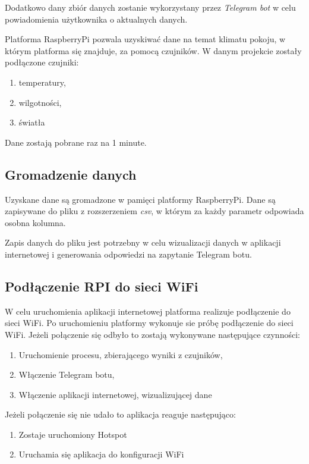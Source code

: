 \documentclass[a4paper]{article}
\begin{document}
Dodatkowo dany zbiór danych zostanie wykorzystany przez \textit{Telegram bot}
w celu powiadomienia użytkownika o aktualnych danych.

Platforma RaspberryPi pozwala uzyskiwać dane na temat klimatu pokoju, w którym platforma się znajduje, za pomocą czujników. W danym projekcie zostały podłączone czujniki:
\begin{enumerate}
\item temperatury,
\item wilgotności,
\item światła
\end{enumerate}

Dane zostają pobrane raz na 1 minute.

\subsection{Gromadzenie danych}

Uzyskane dane są gromadzone w pamięci platformy RaspberryPi. Dane są zapisywane do pliku z rozszerzeniem \textit{csv}, w którym za każdy parametr odpowiada osobna kolumna.

Zapis danych do pliku jest potrzebny w celu wizualizacji danych w aplikacji internetowej i generowania odpowiedzi na zapytanie Telegram botu.

\newpage
\subsection{Podłączenie RPI do sieci WiFi}
W celu uruchomienia aplikacji internetowej platforma realizuje podłączenie do sieci WiFi. Po uruchomieniu platformy wykonuje sie próbę podłączenie do sieci WiFi. \newline
Jeżeli połączenie się odbyło to zostają wykonywane następujące czynności:
\begin{enumerate}
\item Uruchomienie procesu, zbierającego wyniki z czujników,
\item Włączenie Telegram botu,
\item Włączenie aplikacji internetowej, wizualizującej dane
\end{enumerate}
\newline
Jeżeli połączenie się nie udało to aplikacja reaguje następująco:
\begin{enumerate}
\item Zostaje uruchomiony Hotspot
\item Uruchamia się aplikacja do konfiguracji WiFi
\end{enumerate}
\end{document}
